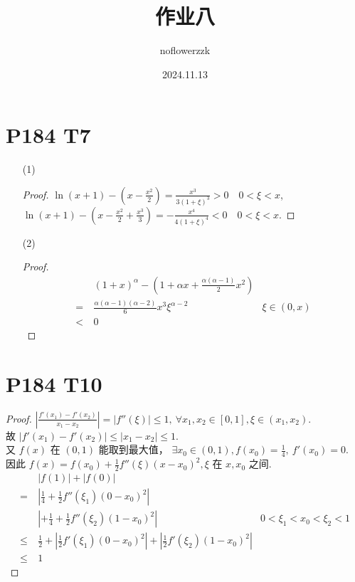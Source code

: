 \documentclass{article}
\title{作业八}
\author{noflowerzzk}
\date{2024.11.13}
\begin{document}
\maketitle


\section*{P184 T7}

\begin{itemize}
    \item [(1)]
    \begin{proof}
        $\ln (x + 1) - (x - \frac{x^2}{2}) = \frac{x^3}{3(1 + \xi)^3} > 0 \quad 0 < \xi < x$, \\
        $\ln(x + 1) - (x - \frac{x^2}{2} + \frac{x^3}{3}) = -\frac{x^4}{4(1 + \xi)^4} < 0 \quad 0 < \xi < x$.
    \end{proof}
    \item [(2)] 
    \begin{proof}
        \begin{align*}
            & (1 + x)^\alpha - (1 + \alpha x + \frac{\alpha(\alpha - 1)}{2}x^2) \\
            =\  & \frac{\alpha(\alpha - 1)(\alpha - 2)}{6}x^3\xi^{\alpha - 2} & \xi \in (0, x)\\
            <\  & 0
        \end{align*}            
    \end{proof}
\end{itemize}

\section*{P184 T10}
\begin{proof}
    $\left\lvert \frac{f'(x_1) - f'(x_2)}{x_1 - x_2}\right\rvert  = \left\lvert f''(\xi)\right\rvert \leqslant 1, \ \forall x_1, x_2 \in [0, 1], \xi \in (x_1, x_2)$. \\
    故 $\left\lvert f'(x_1) - f'(x_2)\right\rvert \leqslant \left\lvert x_1 - x_2\right\rvert \leqslant 1$. \\
    又 $f(x)$ 在 $(0, 1)$ 能取到最大值， $\exists x_0 \in (0, 1), f(x_0) = \frac{1}{4}, \ f'(x_0) = 0$. \\
    因此 $f(x) = f(x_0) + \frac{1}{2}f''(\xi)(x - x_0)^2, \xi$ 在 $x, x_0$ 之间. 
    \begin{align*}
        & \left\lvert f(1)\right\rvert + \left\lvert f(0)\right\rvert \\
         =\  & \left\lvert \frac{1}{4} + \frac{1}{2}f''(\xi_1)(0 - x_0)^2\right\rvert \\
         & \left\rvert + \frac{1}{4} + \frac{1}{2}f''(\xi_2)(1 - x_0)^2\right\rvert & 0 < \xi_1 < x_0 < \xi_2 < 1\\
         \leqslant \  & \frac{1}{2} + \left\lvert \frac{1}{2}f'(\xi_1)(0 - x_0)^2\right\rvert + \left\lvert \frac{1}{2}f'(\xi_2)(1 - x_0)^2\right\rvert \\
         \leqslant \  & 1 
    \end{align*}
\end{proof}
\end{document}
